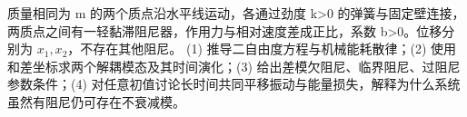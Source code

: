 质量相同为 m 的两个质点沿水平线运动，各通过劲度 k>0 的弹簧与固定壁连接，两质点之间有一轻黏滞阻尼器，作用力与相对速度差成正比，系数 b>0。位移分别为 \(x_{1},x_{2}\)，不存在其他阻尼。
(1) 推导二自由度方程与机械能耗散律；(2) 使用和差坐标求两个解耦模态及其时间演化；(3) 给出差模欠阻尼、临界阻尼、过阻尼参数条件；(4) 对任意初值讨论长时间共同平移振动与能量损失，解释为什么系统虽然有阻尼仍可存在不衰减模。
